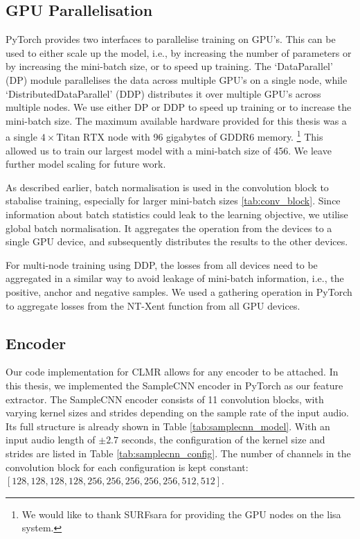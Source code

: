 \subsection{GPU Parallelisation}
PyTorch provides two interfaces to parallelise training on GPU's.
This can be used to either scale up the model, i.e., by increasing the number of parameters or by increasing the mini-batch size, or to speed up training.
The `DataParallel' (DP) module parallelises the data across multiple GPU's on a single node, while `DistributedDataParallel' (DDP) distributes it over multiple GPU's across multiple nodes.
We use either DP or DDP to speed up training or to increase the mini-batch size.
The maximum available hardware provided for this thesis was a a single $4\times \text{Titan RTX}$ node with 96 gigabytes of GDDR6 memory.
\footnote{We would like to thank SURFsara for providing the GPU nodes on the lisa system.}
This allowed us to train our largest model with a mini-batch size of 456. We leave further model scaling for future work.

As described earlier, batch normalisation is used in the convolution block to stabalise training, especially for larger mini-batch sizes \ref{tab:conv_block}.
Since information about batch statistics could leak to the learning objective, we utilise global batch normalisation.
It aggregates the operation from the devices to a single GPU device, and subsequently distributes the results to the other devices.

For multi-node training using DDP, the losses from all devices need to be aggregated in a similar way to avoid leakage of mini-batch information, i.e., the positive, anchor and negative samples. We used a gathering operation in PyTorch to aggregate losses from the NT-Xent function from all GPU devices.

\subsection{Encoder}
Our code implementation for CLMR allows for any encoder to be attached.
In this thesis, we implemented the SampleCNN encoder in PyTorch as our feature extractor.
The SampleCNN encoder consists of 11 convolution blocks, with varying kernel sizes and strides depending on the sample rate of the input audio. Its full structure is already shown in Table \ref{tab:samplecnn_model}.
With an input audio length of $±2.7$ seconds, the configuration of the kernel size and strides are listed in Table \ref{tab:samplecnn_config}.
The number of channels in the convolution block for each configuration is kept constant: $[128, 128, 128, 128, 256, 256, 256 , 256, 256, 512, 512]$.

